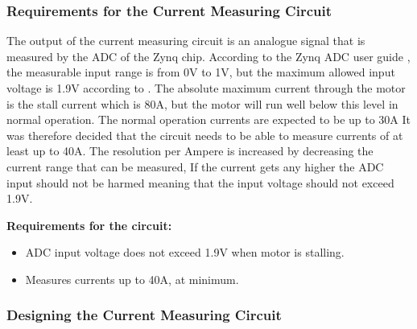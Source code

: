 \subsubsection{Requirements for the Current Measuring Circuit} %
\label{ssub:requirements_for_the_current_measuring_circuit}

The output of the current measuring circuit is an analogue signal that is measured by the ADC of the Zynq chip.
According to the Zynq ADC user guide \cite{zynq_adc}, the measurable input range is from 0V to 1V, but the maximum allowed input voltage is 1.9V according to \cite{adc_zynq_webanswer}.
The absolute maximum current through the motor is the stall current which is 80A, but the motor will run well below this level in normal operation.
The normal operation currents are expected to be up to 30A
It was therefore decided that the circuit  needs to be able to measure currents of at least up to 40A.
The resolution per Ampere is increased by decreasing the current range that can be measured,
If the current gets any higher the ADC input should not be harmed meaning that the input voltage should not exceed 1.9V.

\textbf{Requirements for the circuit:}
\begin{itemize}
	\item ADC input voltage does not exceed 1.9V when motor is stalling.
	\item Measures currents up to 40A, at minimum.
\end{itemize}


\subsubsection{Designing the Current Measuring Circuit} %
\label{ssub:designing_the_current_measuring_circuit}

